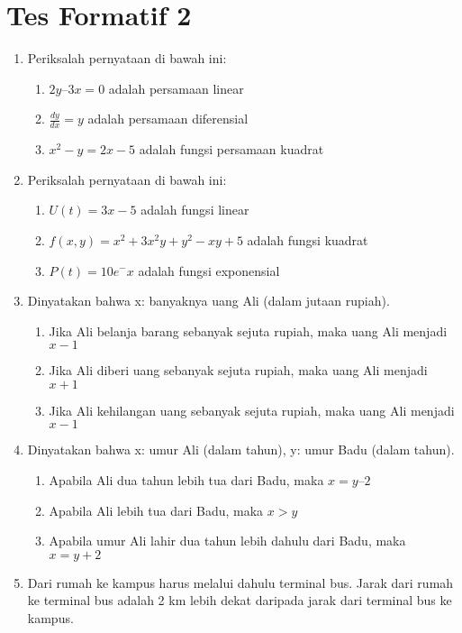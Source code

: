 \documentclass[10pt]{article}
\begin{document}
    \section{Tes Formatif 2}
    \begin{enumerate}
        \item Periksalah pernyataan di bawah ini:
\begin{enumerate}
    \item $2y – 3x=0$ adalah persamaan linear
    \item $\frac{dy}{dx}=y$ adalah  persamaan diferensial
    \item $x^2-y=2x-5$ adalah fungsi persamaan kuadrat
\end{enumerate}
\item Periksalah pernyataan di bawah ini:
\begin{enumerate}
    \item $U(t)=3x-5$ adalah fungsi linear
    \item $f(x,y)=x^2+3x^2y+y^2-xy+5$ adalah fungsi kuadrat
    \item $P(t)=10e^-x$ adalah fungsi exponensial
\end{enumerate}
\item Dinyatakan bahwa x: banyaknya uang Ali (dalam jutaan rupiah).
\begin{enumerate}
    \item Jika Ali belanja barang sebanyak sejuta rupiah, maka uang Ali menjadi $x-1$
    \item Jika Ali diberi uang sebanyak sejuta rupiah, maka uang Ali menjadi $x+1$
    \item Jika Ali kehilangan uang sebanyak sejuta rupiah, maka uang Ali
    menjadi $x-1$
\end{enumerate}
\item Dinyatakan bahwa x: umur Ali (dalam tahun), y: umur Badu (dalam
tahun).\begin{enumerate}
    \item Apabila Ali dua tahun lebih tua dari Badu, maka $x=y–2$
    \item Apabila Ali lebih tua dari Badu, maka $x>y$
    \item Apabila umur Ali lahir dua tahun lebih dahulu dari Badu, maka $x=y+2$
\end{enumerate}
\item Dari rumah ke kampus harus melalui dahulu terminal bus. Jarak dari
rumah ke terminal bus adalah 2 km lebih dekat daripada jarak dari
terminal bus ke kampus.\begin{enumerate}

\end{enumerate}
\end{enumerate}
\end{document}
